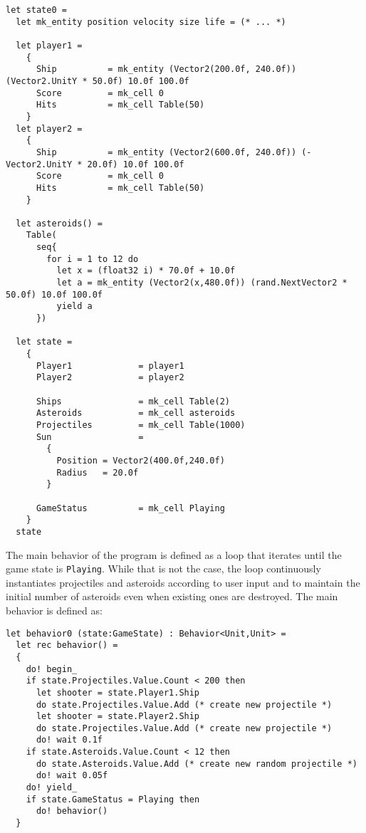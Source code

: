 \begin{lstlisting}
let state0 = 
  let mk_entity position velocity size life = (* ... *)

  let player1 = 
    {
      Ship          = mk_entity (Vector2(200.0f, 240.0f)) (Vector2.UnitY * 50.0f) 10.0f 100.0f
      Score         = mk_cell 0
      Hits          = mk_cell Table(50)
    }
  let player2 = 
    {
      Ship          = mk_entity (Vector2(600.0f, 240.0f)) (-Vector2.UnitY * 20.0f) 10.0f 100.0f
      Score         = mk_cell 0
      Hits          = mk_cell Table(50)
    }

  let asteroids() =
    Table(
      seq{
        for i = 1 to 12 do
          let x = (float32 i) * 70.0f + 10.0f
          let a = mk_entity (Vector2(x,480.0f)) (rand.NextVector2 * 50.0f) 10.0f 100.0f
          yield a
      })

  let state = 
    {
      Player1             = player1
      Player2             = player2

      Ships               = mk_cell Table(2)
      Asteroids           = mk_cell asteroids
      Projectiles         = mk_cell Table(1000)
      Sun                 = 
        {
          Position = Vector2(400.0f,240.0f)
          Radius   = 20.0f
        }

      GameStatus          = mk_cell Playing
    }
  state
\end{lstlisting}

The main behavior of the program is defined as a loop that iterates until the game state is \texttt{Playing}. While that is not the case, the loop continuously instantiates projectiles and asteroids according to user input and to maintain the initial number of asteroids even when existing ones are destroyed. The main behavior is defined as:

\begin{lstlisting}
let behavior0 (state:GameState) : Behavior<Unit,Unit> =
  let rec behavior() = 
  {
    do! begin_
    if state.Projectiles.Value.Count < 200 then
      let shooter = state.Player1.Ship
      do state.Projectiles.Value.Add (* create new projectile *)
      let shooter = state.Player2.Ship
      do state.Projectiles.Value.Add (* create new projectile *)
      do! wait 0.1f
    if state.Asteroids.Value.Count < 12 then
      do state.Asteroids.Value.Add (* create new random projectile *)
      do! wait 0.05f
    do! yield_
    if state.GameStatus = Playing then
      do! behavior()
  }
\end{lstlisting}
